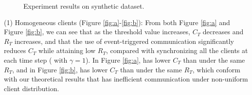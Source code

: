 \begin{figure}
\vspace{-1mm}
\caption{Experiment results on synthetic dataset.}
\end{figure}

(1) Homogeneous clients (Figure \ref{fig:a}-\ref{fig:b}): 
From both Figure \ref{fig:a} and Figure \ref{fig:b}, we can see that as the threshold value increases, $C_{T}$ decreases and $R_{T}$ increases, and that the use of event-triggered communication significantly reduces $C_{T}$ while attaining low $R_{T}$, compared with synchronizing all the clients at each time step (\modelone{} with $\gamma=1$). In Figure \ref{fig:a}, \modelbaseline{} has lower $C_{T}$ than \modelone{} under the same $R_{T}$, and in Figure \ref{fig:b}, \modelone{} has lower $C_{T}$ than \modelbaseline{} under the same $R_{T}$, which conform with our theoretical results that \modelbaseline{} has inefficient communication under non-uniform client distribution.

